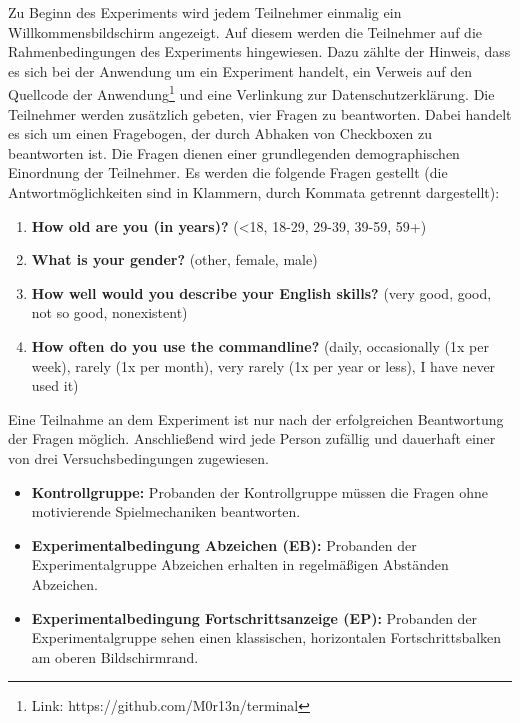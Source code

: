 Zu Beginn des Experiments wird jedem Teilnehmer einmalig ein Willkommensbildschirm angezeigt. Auf diesem werden die Teilnehmer auf die Rahmenbedingungen des Experiments hingewiesen. Dazu zählte der Hinweis, dass es sich bei der Anwendung um ein Experiment handelt, ein Verweis auf den Quellcode der Anwendung\footnote{Link: https://github.com/M0r13n/terminal} und eine Verlinkung zur Datenschutzerklärung. Die Teilnehmer werden zusätzlich gebeten, vier Fragen zu beantworten. Dabei handelt es sich um einen Fragebogen, der durch Abhaken von Checkboxen zu beantworten ist. Die Fragen dienen einer grundlegenden demographischen Einordnung der Teilnehmer. Es werden die folgende Fragen gestellt (die Antwortmöglichkeiten sind in Klammern, durch Kommata getrennt dargestellt):

\begin{enumerate}\label{demography}
	 \item \textbf{How old are you (in years)?} (<18, 18-29, 29-39, 39-59, 59+)
     \item \textbf{What is your gender?} (other, female, male)
     \item \textbf{How well would you describe your English skills?} (very good, good, not so good, nonexistent)
     \item \textbf{How often do you use the commandline?} (daily, occasionally (1x per week), rarely (1x per month), very rarely (1x per year or less), I have never used it)
\end{enumerate}

Eine Teilnahme an dem Experiment ist nur nach der erfolgreichen Beantwortung der Fragen möglich. Anschließend wird jede Person zufällig und dauerhaft einer von drei Versuchsbedingungen zugewiesen.


\begin{itemize}
	\item \textbf{Kontrollgruppe:} Probanden der Kontrollgruppe müssen die Fragen ohne motivierende Spielmechaniken beantworten.
	 
    \item \textbf{Experimentalbedingung Abzeichen (EB):} Probanden der Experimentalgruppe Abzeichen erhalten in regelmäßigen Abständen Abzeichen.

    \item \textbf{Experimentalbedingung Fortschrittsanzeige (EP):} Probanden der Experimentalgruppe sehen einen klassischen, horizontalen Fortschrittsbalken am oberen Bildschirmrand.
\end{itemize}

